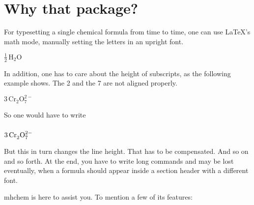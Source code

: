 \documentclass[a4paper,notitlepage]{scrreprt}
\begin{document}
\section{Why that package?}

\noindent
For typesetting a single chemical formula from time to time, one can use \LaTeX's math mode, manually setting the letters in an upright font.

\begin{addmargin}[4em]{0em}
\begin{SideBySideExample}[xrightmargin=3cm]
  $\frac{1}{2}\,\mathrm{H}_2\mathrm{O}$
\end{SideBySideExample}
\end{addmargin}

\noindent
In addition, one has to care about the height of subscripts, as the following example shows. The 2 and the 7 are not aligned properly.

\begin{addmargin}[4em]{0em}
\begin{SideBySideExample}[xrightmargin=3cm]
  $3\,\mathrm{Cr}_2\mathrm{O}_7^{2-}$
\end{SideBySideExample}
\end{addmargin}

\noindent
So one would have to write

\begin{addmargin}[4em]{0em}
\begin{SideBySideExample}[xrightmargin=3cm]
  $3\,\mathrm{Cr}_2^{\strut}\mathrm{O}_7^{2-}$
\end{SideBySideExample}
\end{addmargin}

\noindent
But this in turn changes the line height. That has to be compensated. And so on and so forth. At the end, you have to write long commands and may be lost eventually, when a formula should appear inside a section header with a different font.

\bigskip

\noindent
mhchem is here to assist you. To mention a few of its features:
\smallskip
\end{document}
